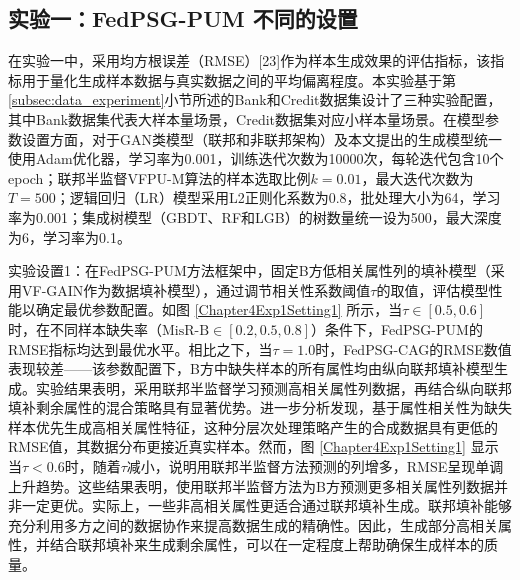 \subsection{实验一：FedPSG-PUM 不同的设置}
在实验一中，采用均方根误差（RMSE）[23]作为样本生成效果的评估指标，该指标用于量化生成样本数据与真实数据之间的平均偏离程度。本实验基于第\ref{subsec:data_experiment}小节所述的Bank和Credit数据集设计了三种实验配置，其中Bank数据集代表大样本量场景，Credit数据集对应小样本量场景。在模型参数设置方面，对于GAN类模型（联邦和非联邦架构）及本文提出的生成模型统一使用Adam优化器，学习率为0.001，训练迭代次数为10000次，每轮迭代包含10个epoch；联邦半监督VFPU-M算法的样本选取比例$k=0.01$，最大迭代次数为$T=500$；逻辑回归（LR）模型采用L2正则化系数为0.8，批处理大小为64，学习率为0.001；集成树模型（GBDT、RF和LGB）的树数量统一设为500，最大深度为6，学习率为0.1。

实验设置1：在FedPSG-PUM方法框架中，固定B方低相关属性列的填补模型（采用VF-GAIN作为数据填补模型），通过调节相关性系数阈值$\tau$的取值，评估模型性能以确定最优参数配置。如图 \ref{Chapter4Exp1Setting1} 所示，当$\tau \in [0.5,0.6]$时，在不同样本缺失率（$\text{MisR-B} \in [0.2,0.5,0.8]$）条件下，FedPSG-PUM的RMSE指标均达到最优水平。相比之下，当$\tau = 1.0$时，FedPSG-CAG的RMSE数值表现较差——该参数配置下，B方中缺失样本的所有属性均由纵向联邦填补模型生成。实验结果表明，采用联邦半监督学习预测高相关属性列数据，再结合纵向联邦填补剩余属性的混合策略具有显著优势。进一步分析发现，基于属性相关性为缺失样本优先生成高相关属性特征，这种分层次处理策略产生的合成数据具有更低的RMSE值，其数据分布更接近真实样本。然而，图 \ref{Chapter4Exp1Setting1} 显示当$\tau < 0.6 $时，随着$\tau$减小，说明用联邦半监督方法预测的列增多，RMSE呈现单调上升趋势。这些结果表明，使用联邦半监督方法为B方预测更多相关属性列数据并非一定更优。实际上，一些非高相关属性更适合通过联邦填补生成。联邦填补能够充分利用多方之间的数据协作来提高数据生成的精确性。因此，生成部分高相关属性，并结合联邦填补来生成剩余属性，可以在一定程度上帮助确保生成样本的质量。

